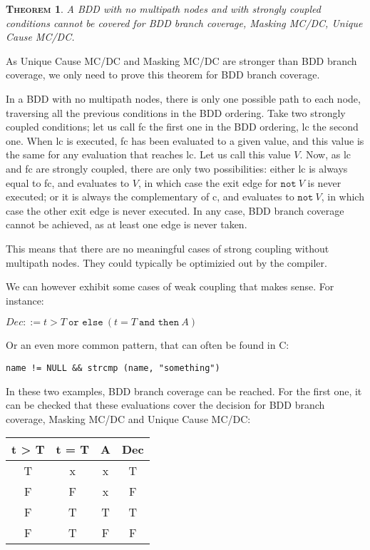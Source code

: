 \documentclass[a4paper,12pt,twoside]{article}
\newcommand{\andthen}{\texttt{and then}}
\newcommand{\orelse}{\texttt{or else}}
\newcommand{\adanot}{\texttt{not}}
\newtheorem{theorem}{\textsc{Theorem}}
\begin{document}
\begin{theorem}
  \label{thm:strong-coupling-no-multipath-nodes}
  A BDD with no multipath nodes and with strongly coupled conditions cannot
  be covered for BDD branch coverage, Masking MC/DC, Unique Cause MC/DC.
\end{theorem}

As Unique Cause MC/DC and Masking MC/DC are stronger than BDD branch
coverage, we only need to prove this theorem for BDD branch coverage.

In a BDD with no multipath nodes, there is only one possible path to each
node, traversing all the previous conditions in the BDD ordering. Take
two strongly coupled conditions; let us call fc the first one in the
BDD ordering, lc the second one. When lc is executed, fc has been
evaluated to a given value, and this value is the same for any
evaluation that reaches lc. Let us call this value $V$. Now, as lc and
fc are strongly coupled, there are only two possibilities: either lc
is always equal to fc, and evaluates to $V$, in which case the exit edge
for $\adanot{} \ V$ is never executed; or it is always the
complementary of c, and evaluates to $\adanot{} \ V$, in which case
the other exit edge is never executed. In any case, BDD branch
coverage cannot be achieved, as at least one edge is never taken.

This means that there are no meaningful cases of strong coupling
without multipath nodes. They could typically be optimizied out by the
compiler.

We can however exhibit some cases of weak coupling that makes sense.
For instance:

$Dec ::= t > T \ \orelse{} \ (t = T \ \andthen{} \ A)$

Or an even more common pattern, that can often be found in C:

\verb|name != NULL && strcmp (name, "something")|

In these two examples, BDD branch coverage can be reached. For the first
one, it can be checked that these evaluations cover the decision for
BDD branch coverage, Masking MC/DC and Unique Cause MC/DC:

\begin{center}
\begin{tabular}{|c|c|c||c|}
\hline
t > T & t = T & A & Dec \\ \hline
T     & x     & x & T \\ \hline
F     & F     & x & F \\ \hline
F     & T     & T & T \\ \hline
F     & T     & F & F \\ \hline
\end{tabular}
\end{center}
\end{document}

